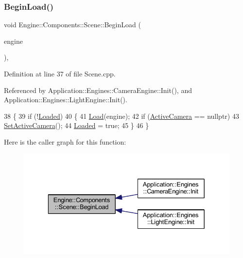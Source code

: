 \subsubsection{\texorpdfstring{Begin\+Load()}{BeginLoad()}}
{\footnotesize\ttfamily void Engine\+::\+Components\+::\+Scene\+::\+Begin\+Load (\begin{DoxyParamCaption}\item[{\mbox{\hyperlink{classEngine_1_1BaseEngine}{Base\+Engine}} $\ast$}]{engine }\end{DoxyParamCaption})\hspace{0.3cm}{\ttfamily [virtual]}, {\ttfamily [inherited]}}



Definition at line 37 of file Scene.\+cpp.



Referenced by Application\+::\+Engines\+::\+Camera\+Engine\+::\+Init(), and Application\+::\+Engines\+::\+Light\+Engine\+::\+Init().


\begin{DoxyCode}
38 \{
39     \textcolor{keywordflow}{if} (!\mbox{\hyperlink{classEngine_1_1Components_1_1Scene_ae828757eea5410550f6674421051a783}{Loaded}})
40     \{
41         \mbox{\hyperlink{classEngine_1_1Components_1_1Scene_a23c5b23e66646443670a487e7c016e73}{Load}}(engine);
42         \textcolor{keywordflow}{if} (\mbox{\hyperlink{classEngine_1_1Components_1_1Scene_a9408befee37d89e2c001d25b9e4ed75a}{ActiveCamera}} == \textcolor{keyword}{nullptr})
43             \mbox{\hyperlink{classEngine_1_1Components_1_1Scene_a936218df56c481f3aa12d684cee038f3}{SetActiveCamera}}();
44         \mbox{\hyperlink{classEngine_1_1Components_1_1Scene_ae828757eea5410550f6674421051a783}{Loaded}} = \textcolor{keyword}{true};
45     \}
46 \}
\end{DoxyCode}
Here is the caller graph for this function\+:
\nopagebreak
\begin{figure}[H]
\begin{center}
\leavevmode
\includegraphics[width=329pt]{classEngine_1_1Components_1_1Scene_af18bd334fe66952b8d79b8e9e99ab2d8_icgraph}
\end{center}
\end{figure}
\mbox{\label{classApplication_1_1Scenes_1_1TriangleScene_a5622996232a2ad52735251c8398b0c9a}} 
